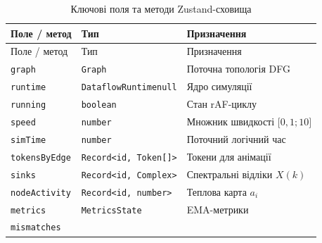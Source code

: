 \begin{longtable}[]{@{}
  >{\raggedright\arraybackslash}p{}
  >{\raggedright\arraybackslash}p{}
  >{\raggedright\arraybackslash}p{}@{}}
\caption{\protect{}\label{tab:store}{}Ключові поля та
методи Zustand-сховища}\tabularnewline
\toprule\noalign{}
\begin{minipage}[b]{\linewidth}\raggedright
Поле / метод
\end{minipage} & \begin{minipage}[b]{\linewidth}\raggedright
Тип
\end{minipage} & \begin{minipage}[b]{\linewidth}\raggedright
Призначення
\end{minipage} \\
\midrule\noalign{}
\endfirsthead
\toprule\noalign{}
\begin{minipage}[b]{\linewidth}\raggedright
Поле / метод
\end{minipage} & \begin{minipage}[b]{\linewidth}\raggedright
Тип
\end{minipage} & \begin{minipage}[b]{\linewidth}\raggedright
Призначення
\end{minipage} \\
\midrule\noalign{}
\endhead
\bottomrule\noalign{}
\endlastfoot
\texttt{graph} & \texttt{Graph} & Поточна топологія DFG \\
\texttt{runtime} & \texttt{DataflowRuntimenull} & Ядро симуляції \\
\texttt{running} & \texttt{boolean} & Стан rAF-циклу \\
\texttt{speed} & \texttt{number} & Множник швидкості
\(\lbrack 0,1;10\rbrack\) \\
\texttt{simTime} & \texttt{number} & Поточний логічний час \\
\texttt{tokensByEdge} &
\texttt{Record\textless{}id,\ Token{[}{]}\textgreater{}} & Токени для
анімації \\
\texttt{sinks} & \texttt{Record\textless{}id,\ Complex\textgreater{}} &
Спектральні відліки \(X(k)\) \\
\texttt{nodeActivity} &
\texttt{Record\textless{}id,\ number\textgreater{}} & Теплова карта
\(a_{i}\) \\
\texttt{metrics} & \texttt{MetricsState} & EMA-метрики \\
\texttt{mismatches} &

\end{longtable}
